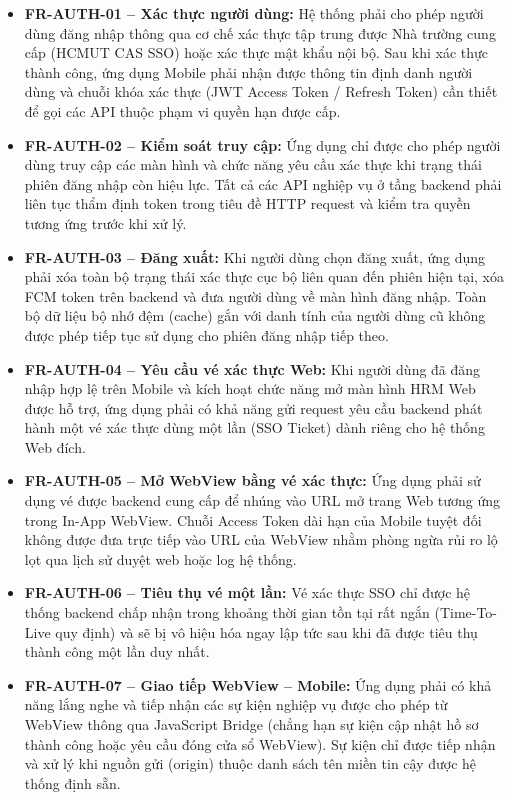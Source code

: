 \begin{itemize}[leftmargin=1.5cm]
    \item \textbf{FR-AUTH-01 -- Xác thực người dùng:} Hệ thống phải cho phép người dùng đăng nhập thông qua cơ chế xác thực tập trung được Nhà trường cung cấp (HCMUT CAS SSO) hoặc xác thực mật khẩu nội bộ. Sau khi xác thực thành công, ứng dụng Mobile phải nhận được thông tin định danh người dùng và chuỗi khóa xác thực (JWT Access Token / Refresh Token) cần thiết để gọi các API thuộc phạm vi quyền hạn được cấp.
    
    \item \textbf{FR-AUTH-02 -- Kiểm soát truy cập:} Ứng dụng chỉ được cho phép người dùng truy cập các màn hình và chức năng yêu cầu xác thực khi trạng thái phiên đăng nhập còn hiệu lực. Tất cả các API nghiệp vụ ở tầng backend phải liên tục thẩm định token trong tiêu đề HTTP request và kiểm tra quyền tương ứng trước khi xử lý.
    
    \item \textbf{FR-AUTH-03 -- Đăng xuất:} Khi người dùng chọn đăng xuất, ứng dụng phải xóa toàn bộ trạng thái xác thực cục bộ liên quan đến phiên hiện tại, xóa FCM token trên backend và đưa người dùng về màn hình đăng nhập. Toàn bộ dữ liệu bộ nhớ đệm (cache) gắn với danh tính của người dùng cũ không được phép tiếp tục sử dụng cho phiên đăng nhập tiếp theo.
    
    \item \textbf{FR-AUTH-04 -- Yêu cầu vé xác thực Web:} Khi người dùng đã đăng nhập hợp lệ trên Mobile và kích hoạt chức năng mở màn hình HRM Web được hỗ trợ, ứng dụng phải có khả năng gửi request yêu cầu backend phát hành một vé xác thực dùng một lần (SSO Ticket) dành riêng cho hệ thống Web đích.
    
    \item \textbf{FR-AUTH-05 -- Mở WebView bằng vé xác thực:} Ứng dụng phải sử dụng vé được backend cung cấp để nhúng vào URL mở trang Web tương ứng trong In-App WebView. Chuỗi Access Token dài hạn của Mobile tuyệt đối không được đưa trực tiếp vào URL của WebView nhằm phòng ngừa rủi ro lộ lọt qua lịch sử duyệt web hoặc log hệ thống.
    
    \item \textbf{FR-AUTH-06 -- Tiêu thụ vé một lần:} Vé xác thực SSO chỉ được hệ thống backend chấp nhận trong khoảng thời gian tồn tại rất ngắn (Time-To-Live quy định) và sẽ bị vô hiệu hóa ngay lập tức sau khi đã được tiêu thụ thành công một lần duy nhất.
    
    \item \textbf{FR-AUTH-07 -- Giao tiếp WebView -- Mobile:} Ứng dụng phải có khả năng lắng nghe và tiếp nhận các sự kiện nghiệp vụ được cho phép từ WebView thông qua JavaScript Bridge (chẳng hạn sự kiện cập nhật hồ sơ thành công hoặc yêu cầu đóng cửa sổ WebView). Sự kiện chỉ được tiếp nhận và xử lý khi nguồn gửi (origin) thuộc danh sách tên miền tin cậy được hệ thống định sẵn.
\end{itemize}

